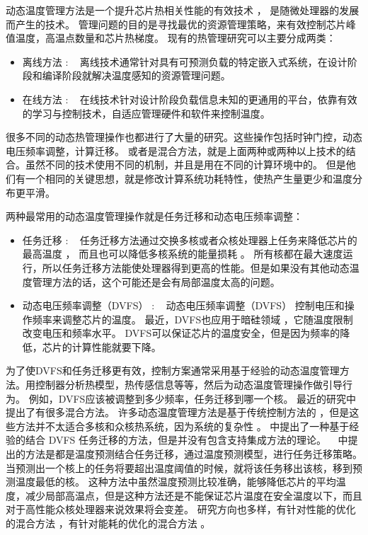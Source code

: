 动态温度管理方法是一个提升芯片热相关性能的有效技术 \cite{Donald:ISCA'06}， 是随微处理器的发展而产生的技术。
管理问题的目的是寻找最优的资源管理策略，来有效控制芯片峰值温度，高温点数量和芯片热梯度。
现有的热管理研究可以主要分成两类：
\begin{itemize}
\item 离线方法 : ~ 离线技术通常针对具有可预测负载的特定嵌入式系统，在设计阶段和编译阶段就解决温度感知的资源管理问题。
\item 在线方法 : ~ 在线技术针对设计阶段负载信息未知的更通用的平台，依靠有效的学习与控制技术，自适应管理硬件和软件来控制温度。
\end{itemize}

很多不同的动态热管理操作也都进行了大量的研究。这些操作包括时钟门控，动态电压频率调整，计算迁移。
或者是混合方法，就是上面两种或两种以上技术的结合。虽然不同的技术使用不同的机制，并且是用在不同的计算环境中的。
但是他们有一个相同的关键思想，就是修改计算系统功耗特性，使热产生量更少和温度分布更平滑。

两种最常用的动态温度管理操作就是任务迁移和动态电压频率调整：
\begin{itemize}
\item 任务迁移 :  ~ 任务迁移方法通过交换多核或者众核处理器上任务来降低芯片的最高温度 \cite{Powell:ASPLOS'04,Ge:DAC'10,Chantem:TVLSI'11,Liu:DATE'12,Ayoub:ISLPED'09,Ebi:ICCAD'09} ，
而且也可以降低多核系统的能量损耗 \cite{Cong:ISLPED'12}。
所有核都在最大速度运行，所以任务迁移方法能使处理器得到更高的性能。但是如果没有其他动态温度管理方法的话，这个可能还是会有局部温度太高的问题。
\item 动态电压频率调整（DVFS） :  ~ 动态电压频率调整（DVFS）\cite{Skadron:ISCA'03,Jayaseelan:ICCAD'09,Mutapcic:TCASI'09} 控制电压和操作频率来调整芯片的温度。
 最近，DVFS也应用于暗硅领域 \cite{Khdr:dac'15,Muthukaruppan:dac'13}，它随温度限制改变电压和频率水平。
 DVFS可以保证芯片的温度安全，但是因为频率的降低，芯片的计算性能就要下降。
\end{itemize}


 
 
 为了使DVFS和任务迁移更有效，控制方案通常采用基于经验的动态温度管理方法。用控制器分析热模型，热传感信息等等，然后为动态温度管理操作做引导行为。
 例如，DVFS应该被调整到多少频率，任务迁移到哪一个核。
 最近的研究中提出了有很多混合方法。
 许多动态温度管理方法是基于传统控制方法的 \cite{Kadin:GLSVLSI'09}，但是这些方法并不太适合多核和众核热系统，因为系统的复杂性 \cite{Bartolini:TPDS'13}。 
 \cite{Brooks:HPCA'04}中提出了一种基于经验的结合 DVFS 任务迁移的方法，但是并没有包含支持集成方法的理论。
 ~\cite{yeo2008predictive,coskun2008proactive} 中提出的方法是都是温度预测结合任务迁移，通过温度预测模型，进行任务迁移策略。
 当预测出一个核上的任务将要超出温度阈值的时候，就将该任务移出该核，移到预测温度最低的核。
 这种方法中虽然温度预测比较准确，能够降低芯片的平均温度，减少局部高温点，但是这种方法还是不能保证芯片温度在安全温度以下，而且对于高性能众核处理器来说效果将会变差。
 研究方向也多样，有针对性能的优化的混合方法 \cite{Hanumaiah:TCAD'11}，有针对能耗的优化的混合方法 \cite{Hanumaiah:TCOMP'14,Tan:ASPDAC'15}。
 
